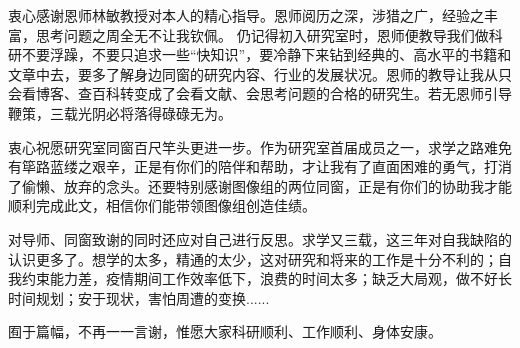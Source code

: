 \begin{acknowledgement}
    衷心感谢恩师林敏教授对本人的精心指导。恩师阅历之深，涉猎之广，经验之丰富，思考问题之周全无不让我钦佩。
    仍记得初入研究室时，恩师便教导我们做科研不要浮躁，不要只追求一些“快知识”，要冷静下来钻到经典的、高水平的书籍和文章中去，要多了解身边同窗的研究内容、行业的发展状况。恩师的教导让我从只会看博客、查百科转变成了会看文献、会思考问题的合格的研究生。若无恩师引导鞭策，三载光阴必将落得碌碌无为。

    衷心祝愿研究室同窗百尺竿头更进一步。作为研究室首届成员之一，求学之路难免有筚路蓝缕之艰辛，正是有你们的陪伴和帮助，才让我有了直面困难的勇气，打消了偷懒、放弃的念头。还要特别感谢图像组的两位同窗，正是有你们的协助我才能顺利完成此文，相信你们能带领图像组创造佳绩。

    对导师、同窗致谢的同时还应对自己进行反思。求学又三载，这三年对自我缺陷的认识更多了。想学的太多，精通的太少，这对研究和将来的工作是十分不利的；自我约束能力差，疫情期间工作效率低下，浪费的时间太多；缺乏大局观，做不好长时间规划；安于现状，害怕周遭的变换......

    囿于篇幅，不再一一言谢，惟愿大家科研顺利、工作顺利、身体安康。
\end{acknowledgement}
